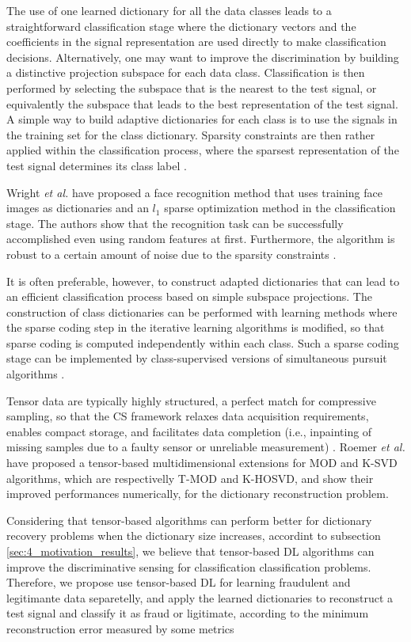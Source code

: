The use of one learned dictionary for all the data classes leads to a straightforward classification stage where the dictionary vectors and the coefficients in the signal representation are used directly to make classification decisions. Alternatively, one may want to improve the discrimination by building a distinctive projection subspace for each data class. Classification is then performed by selecting the subspace that is the nearest to the test signal, or equivalently the subspace that leads to the best representation of the test signal. A simple way to build adaptive dictionaries for each class is to use the signals in the training set for the class dictionary. Sparsity constraints are then rather applied within the classification process, where the sparsest representation of the test signal determines its class label \cite{tosic2011dictionary}.

Wright \emph{et al.} \cite{wright2009robust} have proposed a face recognition method that uses training face images as dictionaries and an $l_1$ sparse optimization method in the classification stage. The authors show that the recognition task can be successfully accomplished even using random features at first. Furthermore, the algorithm is robust to a certain amount of noise due to the sparsity constraints \cite{tosic2011dictionary}.

It is often preferable, however, to construct adapted dictionaries that can lead to an efficient classification process based on simple subspace projections. The construction of class dictionaries can be performed with learning methods where the sparse coding step in the iterative learning algorithms is modified, so that sparse coding is computed independently within each class. Such a sparse coding stage can be implemented by class-supervised versions of simultaneous pursuit algorithms \cite{tosic2011dictionary}.

Tensor data are typically highly structured, a perfect match for compressive sampling, so that the CS framework relaxes data acquisition requirements, enables compact storage, and facilitates data completion (i.e., inpainting of missing samples due to a faulty sensor or unreliable measurement) \cite{cichocki2015tensor}. Roemer \emph{et al.} \cite{roemer2014tensor} have proposed a tensor-based multidimensional extensions for MOD and K-SVD algorithms, which are respectivelly T-MOD and K-HOSVD, and show their improved performances numerically, for the dictionary reconstruction problem. 

Considering that tensor-based algorithms can perform better for dictionary recovery problems when the dictionary size increases, accordint to subsection \ref{sec:4_motivation_results}, we believe that tensor-based DL algorithms can improve the discriminative sensing for classification classification problems. Therefore, we propose use tensor-based DL for learning fraudulent and legitimante data separetelly, and apply the learned dictionaries to reconstruct a test signal and classify it as fraud or ligitimate, according to the minimum reconstruction error measured by some metrics


